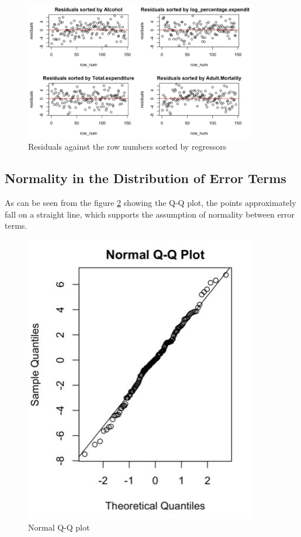 \begin{figure}
  \centering
  \includegraphics[width = 0.9\textwidth]{figures/independence.PNG}
  \caption{Residuals against the row numbers sorted by regressors}
  \label{fig:independence}
\end{figure}

\subsection{Normality in the Distribution of Error Terms}
\label{sec:normality}
As can be seen from the figure \ref{fig:normality} showing the Q-Q plot, the points approximately fall on a straight line, which supports the assumption of normality between error terms.

\begin{figure}
  \centering
  \includegraphics[width = 0.9\textwidth]{figures/normality.PNG}
  \caption{Normal Q-Q plot}
  \label{fig:normality}
\end{figure} 

